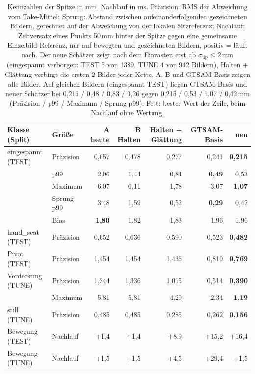 \documentclass[11pt,a4paper,fleqn]{article}
\newcommand{\stip}{\sigma_{\mathrm{tip}}}
\begin{document}
\begin{table}[!htb]
\centering\small
\caption{Kennzahlen der Spitze in mm, Nachlauf in ms. Präzision: RMS der Abweichung vom Take-Mittel; Sprung:
Abstand zwischen aufeinanderfolgenden gezeichneten Bildern, gerechnet auf der Abweichung von der lokalen
Sitzreferenz; Nachlauf: Zeitversatz eines Punkts 50\,mm hinter der Spitze gegen eine gemeinsame
Einzelbild-Referenz, nur auf bewegten und gezeichneten Bildern, positiv = läuft nach. Der neue Schätzer zeigt nach
dem Einrasten erst ab $\stip \le 2$\,mm (eingespannt verborgen: TEST 5 von 1389, TUNE 4 von 942 Bildern),
Halten + Glättung verbirgt die ersten 2 Bilder jeder Kette, A, B und GTSAM-Basis zeigen alle Bilder. Auf gleichen
Bildern (eingespannt TEST) liegen GTSAM-Basis und neuer Schätzer bei 0,216 / 0,48 / 0,83 / 0,26 gegen
0,215 / 0,53 / 1,07 / 0,42\,mm (Präzision / p99 / Maximum / Sprung p99). Fett: bester Wert der Zeile, beim
Nachlauf ohne Wertung.}
\label{tab:ergebnis}
\renewcommand{\arraystretch}{1.05}
\begin{tabular}{@{}llrrrrr@{}}
  \toprule
  Klasse (Split) & Größe & A heute & B Halten & Halten + Glättung & GTSAM-Basis & neu \\
  \midrule
  eingespannt (TEST) & Präzision     & 0,657 & 0,478 & 0,277 & 0,241 & \textbf{0,215} \\
                     & p99           & 2,96  & 1,44  & 0,84  & \textbf{0,49}  & 0,53 \\
                     & Maximum       & 6,07  & 6,11  & 1,78  & 3,07  & \textbf{1,07} \\
                     & Sprung p99    & 3,48  & 1,59  & 0,52  & \textbf{0,29}  & 0,42 \\
                     & Bias          & \textbf{1,80} & 1,82 & 1,83 & 1,96 & 1,96 \\
  hand\_seat (TEST)  & Präzision     & 0,652 & 0,636 & 0,590 & 0,523 & \textbf{0,482} \\
  Pivot (TEST)       & Präzision     & 1,454 & 1,454 & 1,436 & 0,819 & \textbf{0,769} \\
  Verdeckung (TUNE)  & Präzision     & 1,344 & 1,336 & 1,015 & 0,514 & \textbf{0,390} \\
                     & Maximum       & 5,81  & 5,81  & 4,29  & 2,34  & \textbf{1,19} \\
  still (TUNE)       & Präzision     & 0,485 & 0,485 & 0,285 & 0,262 & \textbf{0,156} \\
  Bewegung (TEST)    & Nachlauf      & +1,4  & +1,4  & +8,9  & +15,2 & +16,4 \\
  Bewegung (TUNE)    & Nachlauf      & +1,5  & +1,5  & +4,5  & +29,4 & +1,5 \\
  \bottomrule
\end{tabular}
\end{table}
\end{document}
